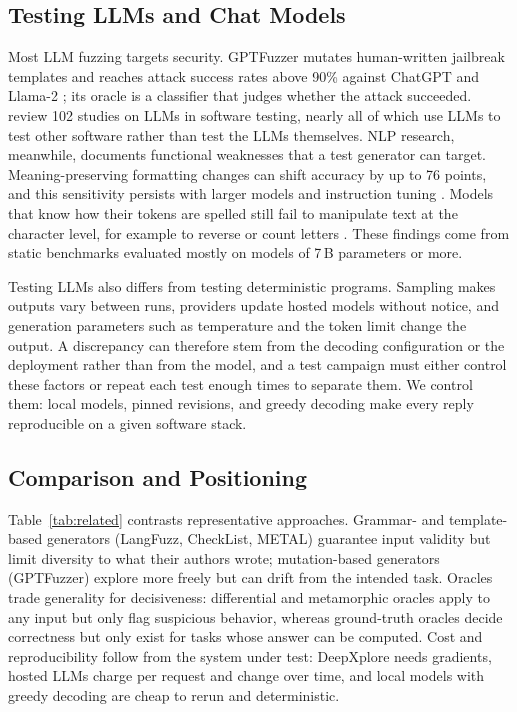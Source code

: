 \subsection{Testing LLMs and Chat Models}

Most LLM fuzzing targets security. GPTFuzzer mutates human-written jailbreak templates and reaches attack success rates above 90\% against ChatGPT and Llama-2 \citep{yu2023gptfuzzer}; its oracle is a classifier that judges whether the attack succeeded. \citet{wang2024survey} review 102 studies on LLMs in software testing, nearly all of which use LLMs to test other software rather than test the LLMs themselves. NLP research, meanwhile, documents functional weaknesses that a test generator can target. Meaning-preserving formatting changes can shift accuracy by up to 76 points, and this sensitivity persists with larger models and instruction tuning \citep{sclar2024formatting}. Models that know how their tokens are spelled still fail to manipulate text at the character level, for example to reverse or count letters \citep{edman2024cute}. These findings come from static benchmarks evaluated mostly on models of 7\,B parameters or more.

Testing LLMs also differs from testing deterministic programs. Sampling makes outputs vary between runs, providers update hosted models without notice, and generation parameters such as temperature and the token limit change the output. A discrepancy can therefore stem from the decoding configuration or the deployment rather than from the model, and a test campaign must either control these factors or repeat each test enough times to separate them. We control them: local models, pinned revisions, and greedy decoding make every reply reproducible on a given software stack.

\subsection{Comparison and Positioning}

Table~\ref{tab:related} contrasts representative approaches. Grammar- and template-based generators (LangFuzz, CheckList, METAL) guarantee input validity but limit diversity to what their authors wrote; mutation-based generators (GPTFuzzer) explore more freely but can drift from the intended task. Oracles trade generality for decisiveness: differential and metamorphic oracles apply to any input but only flag suspicious behavior, whereas ground-truth oracles decide correctness but only exist for tasks whose answer can be computed. Cost and reproducibility follow from the system under test: DeepXplore needs gradients, hosted LLMs charge per request and change over time, and local models with greedy decoding are cheap to rerun and deterministic.

